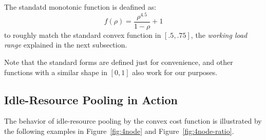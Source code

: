 The standatd monotonic function is deafined as:
\begin{equation*}
	f(\rho) = \frac{\rho^{4.5}}{1 - \rho} + 1
\end{equation*}
to roughly match the standard convex function in $[.5, .75]$,
the {\em working load range} explained in the next subsection.

Note that the standard forms are defined just for convenience, and
other functions with a similar shape in $[0,1]$ also work for our
purposes.

\subsection{Idle-Resource Pooling in Action}

The behavior of idle-resource pooling by the convex cost function is
illustrated by the following examples in Figure~\ref{fig:4node} and
Figure~\ref{fig:4node-ratio}.

